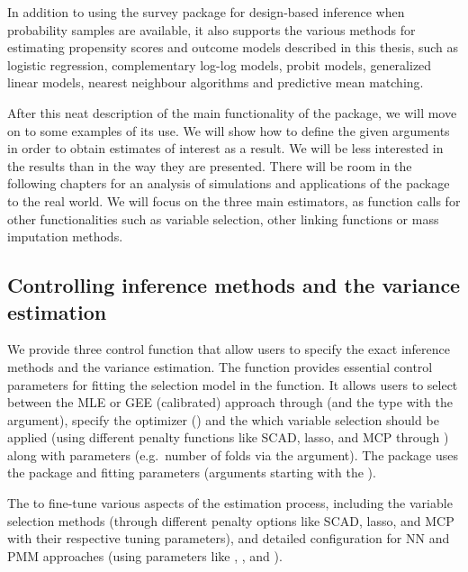 \documentclass[
]{jss}
\begin{document}
In addition to using the survey package for design-based inference when
probability samples are available, it also supports the various methods
for estimating propensity scores and outcome models described in this
thesis, such as logistic regression, complementary log-log models,
probit models, generalized linear models, nearest neighbour algorithms
and predictive mean matching.

After this neat description of the main functionality of the package, we
will move on to some examples of its use. We will show how to define the
given arguments in order to obtain estimates of interest as a result. We
will be less interested in the results than in the way they are
presented. There will be room in the following chapters for an analysis
of simulations and applications of the package to the real world. We
will focus on the three main estimators, as function calls for other
functionalities such as variable selection, other linking functions or
mass imputation methods.

\subsection{Controlling inference methods and the variance
estimation}\label{controlling-inference-methods-and-the-variance-estimation}

We provide three control function that allow users to specify the exact
inference methods and the variance estimation. The 
function provides essential control parameters for fitting the selection
model in the  function. It allows users to select between
the MLE or GEE (calibrated) approach through  (and
the type with the  argument), specify the optimizer
() and the which variable selection should be applied
(using different penalty functions like SCAD, lasso, and MCP through
) along with parameters (e.g.~number of folds via the
 argument). The package uses the  package and
fitting parameters (arguments starting with the ).

The  to fine-tune various aspects of the estimation
process, including the variable selection methods (through different
penalty options like SCAD, lasso, and MCP with their respective tuning
parameters), and detailed configuration for NN and PMM approaches (using
parameters like , , and
).
\end{document}
